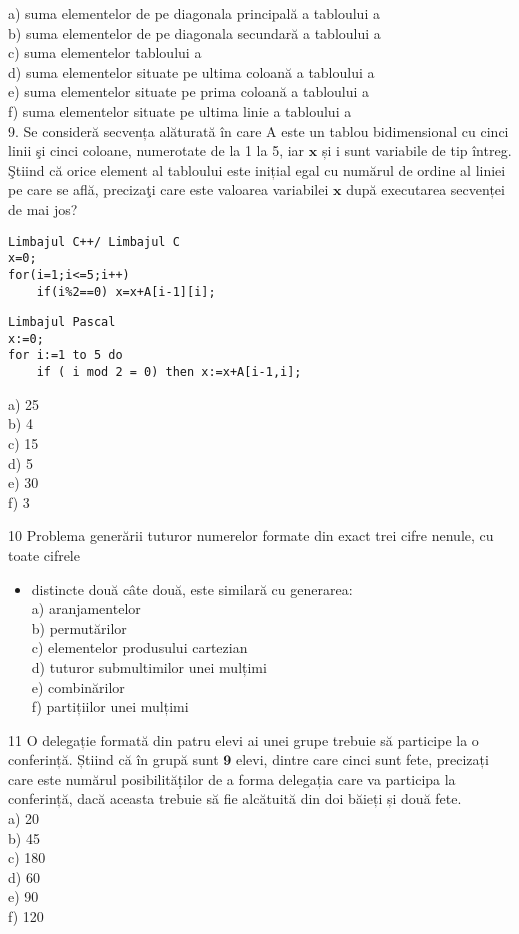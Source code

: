 a) suma elementelor de pe diagonala principală a tabloului a\\
b) suma elementelor de pe diagonala secundară a tabloului a\\
c) suma elementelor tabloului a\\
d) suma elementelor situate pe ultima coloană a tabloului a\\
e) suma elementelor situate pe prima coloană a tabloului a\\
f) suma elementelor situate pe ultima linie a tabloului a\\
9. Se consideră secvența alăturată în care A este un tablou bidimensional cu cinci linii şi cinci coloane, numerotate de la 1 la 5, iar $\mathbf{x}$ și i sunt variabile de tip întreg. Ştiind că orice element al tabloului este inițial egal cu numărul de ordine al liniei pe care se află, precizaţi care este valoarea variabilei $\mathbf{x}$ după executarea secvenței de mai jos?

\begin{verbatim}
Limbajul C++/ Limbajul C
x=0;
for(i=1;i<=5;i++)
    if(i%2==0) x=x+A[i-1][i];
\end{verbatim}

\begin{verbatim}
Limbajul Pascal
x:=0;
for i:=1 to 5 do
    if ( i mod 2 = 0) then x:=x+A[i-1,i];
\end{verbatim}

a) 25\\
b) 4\\
c) 15\\
d) 5\\
e) 30\\
f) 3

10 Problema generării tuturor numerelor formate din exact trei cifre nenule, cu toate cifrele

\begin{itemize}
  \item distincte două câte două, este similară cu generarea:\\
a) aranjamentelor\\
b) permutărilor\\
c) elementelor produsului cartezian\\
d) tuturor submultimilor unei mulțimi\\
e) combinărilor\\
f) partițiilor unei mulțimi
\end{itemize}

11 O delegație formată din patru elevi ai unei grupe trebuie să participe la o conferință. Știind că în grupă sunt $\mathbf{9}$ elevi, dintre care cinci sunt fete, precizați care este numărul posibilităț̦ilor de a forma delegația care va participa la conferință, dacă aceasta trebuie să fie alcătuită din doi băieți și două fete.\\
a) 20\\
b) 45\\
c) 180\\
d) 60\\
e) 90\\
f) 120

